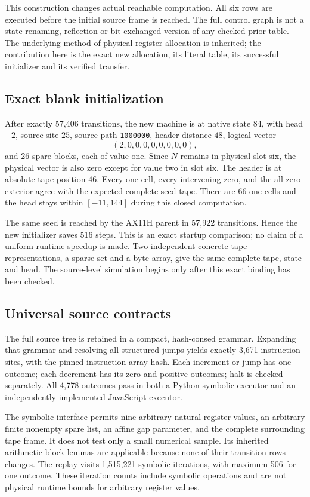 \documentclass[11pt,letterpaper]{article}
\begin{document}
This construction changes actual reachable computation. All six rows are executed before the initial source frame is reached. The full control graph is not a state renaming, reflection or bit-exchanged version of any checked prior table. The underlying method of physical register allocation is inherited; the contribution here is the exact new allocation, its literal table, its successful initializer and its verified transfer.

\subsection{Exact blank initialization}

After exactly 57,406 transitions, the new machine is at native state $84$, with head $-2$, source site $25$, source path \texttt{1000000}, header distance $48$, logical vector
\[
       (2,0,0,0,0,0,0,0,0),
\]
and 26 spare blocks, each of value one. Since $N$ remains in physical slot six, the physical vector is also zero except for value two in slot six. The header is at absolute tape position $46$. Every one-cell, every intervening zero, and the all-zero exterior agree with the expected complete seed tape. There are 66 one-cells and the head stays within $[-11,144]$ during this closed computation.

The same seed is reached by the AX11H parent in 57,922 transitions. Hence the new initializer saves 516 steps. This is an exact startup comparison; no claim of a uniform runtime speedup is made. Two independent concrete tape representations, a sparse set and a byte array, give the same complete tape, state and head. The source-level simulation begins only after this exact binding has been checked.

\subsection{Universal source contracts}

The full source tree is retained in a compact, hash-consed grammar. Expanding that grammar and resolving all structured jumps yields exactly 3,671 instruction sites, with the pinned instruction-array hash. Each increment or jump has one outcome; each decrement has its zero and positive outcomes; halt is checked separately. All 4,778 outcomes pass in both a Python symbolic executor and an independently implemented JavaScript executor.

The symbolic interface permits nine arbitrary natural register values, an arbitrary finite nonempty spare list, an affine gap parameter, and the complete surrounding tape frame. It does not test only a small numerical sample. Its inherited arithmetic-block lemmas are applicable because none of their transition rows changes. The replay visits 1,515,221 symbolic iterations, with maximum 506 for one outcome. These iteration counts include symbolic operations and are not physical runtime bounds for arbitrary register values.
\end{document}
